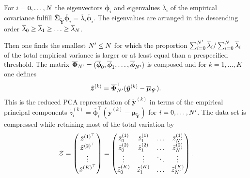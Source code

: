 For \(i=0,\ldots,N\) the eigenvectors \(\overline{\bm{\phi}}_i\) and eigenvalues \(\overline{\lambda}_i\) of the empirical covariance
fulfill \(\overline{\bm{\Sigma}}_{\tilde{\bm{Y}}} \overline{\bm{\phi}}_i = \overline{\lambda}_i \overline{\bm{\phi}}_i\).
The eigenvalues are arranged in the descending order \(\overline{\lambda}_0 \geq \overline{\lambda}_1 \geq \ldots \geq \overline{\lambda}_N\).
\par %
Then one finds the smallest \(N^\prime \leq N\) for which the proportion \(\sum_{i=0}^{N^\prime} \overline{\lambda}_i / \sum_{i=0}^N \overline{\lambda}_i\)
of the total empirical variance is larger or at least equal than a prespecified threshold.
The matrix \(\overline{\bm{\Phi}}_{N^\prime} = (\overline{\bm{\phi}}_0,\overline{\bm{\phi}}_1,\ldots,\overline{\bm{\phi}}_{N^\prime})\) is composed
and for \(k=1,\ldots,K\) one defines
\begin{equation} \label{eq:Hydro:CompressedRepresentation}
  \tilde{\bm{z}}^{(k)} = \overline{\bm{\Phi}}_{N^\prime}^\top (\tilde{\bm{y}}^{(k)} - \overline{\bm{\mu}}_{\tilde{\bm{Y}}}).
\end{equation}
This is the reduced PCA representation of \(\tilde{\bm{y}}^{(k)}\) in terms of the empirical principal components
\(\tilde{z}_i^{(k)} = \overline{\bm{\phi}}_i^\top (\tilde{\bm{y}}^{(k)}-\overline{\bm{\mu}}_{\tilde{\bm{Y}}})\) for \(i=0,\ldots,N^\prime\).
The data set is compressed while retaining most of the total variation by
\begin{equation} \label{eq:Hydro:CompressedMatrix}
  \mathcal{Z} = \begin{pmatrix}
                  \tilde{\bm{z}}^{{(1)}^\top} \\
                  \tilde{\bm{z}}^{{(2)}^\top} \\
                  \vdots \\
                  \tilde{\bm{z}}^{{(K)}^\top} \\
                \end{pmatrix}
              = \begin{pmatrix}
                  \tilde{z}_0^{(1)} & \tilde{z}_1^{(1)} & \ldots & \tilde{z}_{N^\prime}^{(1)} \\
                  \tilde{z}_0^{(2)} & \tilde{z}_1^{(2)} & \ldots & \tilde{z}_{N^\prime}^{(2)} \\
                  \vdots            & \vdots            & \ddots & \vdots \\
                  \tilde{z}_0^{(K)} & \tilde{z}_1^{(K)} & \ldots & \tilde{z}_{N^\prime}^{(K)} \\
                \end{pmatrix}.
\end{equation}
